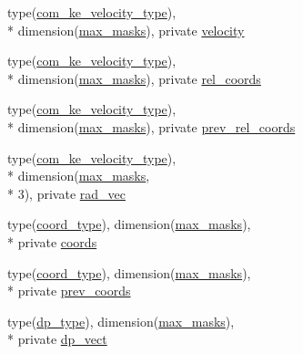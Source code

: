 \begin{DoxyCompactItemize}
\item 
type(\hyperlink{structcalc__com__ke_1_1com__ke__velocity__type}{com\-\_\-ke\-\_\-velocity\-\_\-type}), \\*
dimension(\hyperlink{classcalc__com__ke_aa0ccd626cbe2c83360fc3f3f322a49e3}{max\-\_\-masks}), private \hyperlink{classcalc__com__ke_a23f9559a29dfbfe86caa7f7b1c64fca3}{velocity}
\item 
type(\hyperlink{structcalc__com__ke_1_1com__ke__velocity__type}{com\-\_\-ke\-\_\-velocity\-\_\-type}), \\*
dimension(\hyperlink{classcalc__com__ke_aa0ccd626cbe2c83360fc3f3f322a49e3}{max\-\_\-masks}), private \hyperlink{classcalc__com__ke_adeeef7662bb6f9e230674e2cdd1a9052}{rel\-\_\-coords}
\item 
type(\hyperlink{structcalc__com__ke_1_1com__ke__velocity__type}{com\-\_\-ke\-\_\-velocity\-\_\-type}), \\*
dimension(\hyperlink{classcalc__com__ke_aa0ccd626cbe2c83360fc3f3f322a49e3}{max\-\_\-masks}), private \hyperlink{classcalc__com__ke_a15c550633f7b3816a88580eaa15f66f8}{prev\-\_\-rel\-\_\-coords}
\item 
type(\hyperlink{structcalc__com__ke_1_1com__ke__velocity__type}{com\-\_\-ke\-\_\-velocity\-\_\-type}), \\*
dimension(\hyperlink{classcalc__com__ke_aa0ccd626cbe2c83360fc3f3f322a49e3}{max\-\_\-masks}, \\*
3), private \hyperlink{classcalc__com__ke_a61064252381e46ec3bd532069234fc1d}{rad\-\_\-vec}
\item 
type(\hyperlink{structcalc__com__ke_1_1coord__type}{coord\-\_\-type}), dimension(\hyperlink{classcalc__com__ke_aa0ccd626cbe2c83360fc3f3f322a49e3}{max\-\_\-masks}), \\*
private \hyperlink{classcalc__com__ke_addbd4c3ed8ec1df3151b8b40b69a06dd}{coords}
\item 
type(\hyperlink{structcalc__com__ke_1_1coord__type}{coord\-\_\-type}), dimension(\hyperlink{classcalc__com__ke_aa0ccd626cbe2c83360fc3f3f322a49e3}{max\-\_\-masks}), \\*
private \hyperlink{classcalc__com__ke_aa0c81fdb3bca271a5cbd1d8db205dd9d}{prev\-\_\-coords}
\item 
type(\hyperlink{structcalc__com__ke_1_1dp__type}{dp\-\_\-type}), dimension(\hyperlink{classcalc__com__ke_aa0ccd626cbe2c83360fc3f3f322a49e3}{max\-\_\-masks}), \\*
private \hyperlink{classcalc__com__ke_aa5cda373aecf567fcffcdb4103785cdc}{dp\-\_\-vect}
\item 

\end{DoxyCompactItemize}
